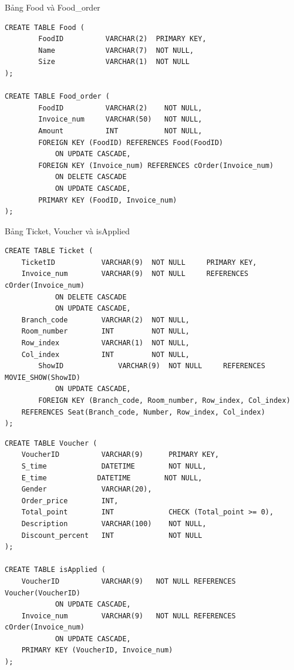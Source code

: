 Bảng Food và Food\_order
\begin{verbatim}
CREATE TABLE Food (
        FoodID          VARCHAR(2)  PRIMARY KEY,
        Name            VARCHAR(7)  NOT NULL,
        Size            VARCHAR(1)  NOT NULL
);

CREATE TABLE Food_order (
        FoodID          VARCHAR(2)    NOT NULL,
        Invoice_num     VARCHAR(50)   NOT NULL,
        Amount          INT           NOT NULL,
        FOREIGN KEY (FoodID) REFERENCES Food(FoodID)
            ON UPDATE CASCADE,
        FOREIGN KEY (Invoice_num) REFERENCES cOrder(Invoice_num)
            ON DELETE CASCADE
            ON UPDATE CASCADE,
        PRIMARY KEY (FoodID, Invoice_num) 
);
\end{verbatim}
Bảng Ticket, Voucher và isApplied
\begin{verbatim}
CREATE TABLE Ticket (
	TicketID           VARCHAR(9)  NOT NULL 	PRIMARY KEY,
	Invoice_num        VARCHAR(9)  NOT NULL 	REFERENCES cOrder(Invoice_num)
            ON DELETE CASCADE
            ON UPDATE CASCADE,
	Branch_code        VARCHAR(2)  NOT NULL,
	Room_number        INT         NOT NULL,
	Row_index          VARCHAR(1)  NOT NULL,
	Col_index          INT         NOT NULL,
        ShowID             VARCHAR(9)  NOT NULL 	REFERENCES MOVIE_SHOW(ShowID)
            ON UPDATE CASCADE,
        FOREIGN KEY (Branch_code, Room_number, Row_index, Col_index) 
	REFERENCES Seat(Branch_code, Number, Row_index, Col_index)
);
\end{verbatim}
\begin{verbatim}
CREATE TABLE Voucher (
	VoucherID          VARCHAR(9)      PRIMARY KEY,
	S_time             DATETIME        NOT NULL,
 	E_time            DATETIME        NOT NULL,
	Gender             VARCHAR(20),
	Order_price        INT,
	Total_point        INT             CHECK (Total_point >= 0),
	Description        VARCHAR(100)    NOT NULL,
	Discount_percent   INT             NOT NULL
);

CREATE TABLE isApplied (
	VoucherID          VARCHAR(9)	NOT NULL REFERENCES Voucher(VoucherID)
            ON UPDATE CASCADE,
	Invoice_num        VARCHAR(9)	NOT NULL REFERENCES cOrder(Invoice_num)
            ON UPDATE CASCADE,
	PRIMARY KEY (VoucherID, Invoice_num)
);
\end{verbatim}

